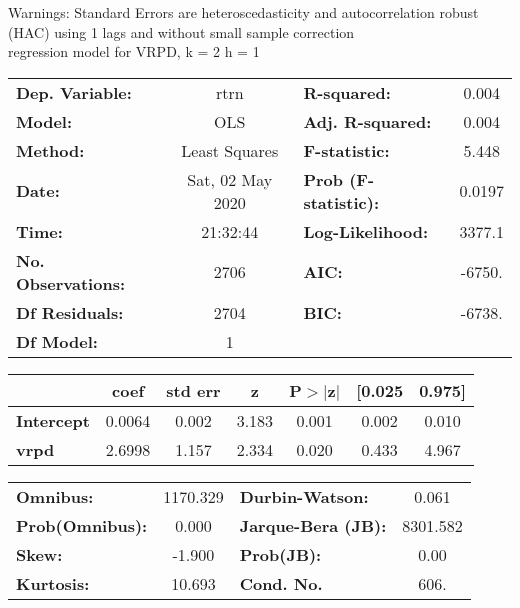 Warnings: \newline
 [1] Standard Errors are heteroscedasticity and autocorrelation robust (HAC) using 1 lags and without small sample correction\\ 

regression model for VRPD, k = 2 h = 1\begin{center}
\begin{tabular}{lclc}
\toprule
\textbf{Dep. Variable:}    &       rtrn       & \textbf{  R-squared:         } &     0.004   \\
\textbf{Model:}            &       OLS        & \textbf{  Adj. R-squared:    } &     0.004   \\
\textbf{Method:}           &  Least Squares   & \textbf{  F-statistic:       } &     5.448   \\
\textbf{Date:}             & Sat, 02 May 2020 & \textbf{  Prob (F-statistic):} &   0.0197    \\
\textbf{Time:}             &     21:32:44     & \textbf{  Log-Likelihood:    } &    3377.1   \\
\textbf{No. Observations:} &        2706      & \textbf{  AIC:               } &    -6750.   \\
\textbf{Df Residuals:}     &        2704      & \textbf{  BIC:               } &    -6738.   \\
\textbf{Df Model:}         &           1      & \textbf{                     } &             \\
\bottomrule
\end{tabular}
\begin{tabular}{lcccccc}
                   & \textbf{coef} & \textbf{std err} & \textbf{z} & \textbf{P$> |$z$|$} & \textbf{[0.025} & \textbf{0.975]}  \\
\midrule
\textbf{Intercept} &       0.0064  &        0.002     &     3.183  &         0.001        &        0.002    &        0.010     \\
\textbf{vrpd}      &       2.6998  &        1.157     &     2.334  &         0.020        &        0.433    &        4.967     \\
\bottomrule
\end{tabular}
\begin{tabular}{lclc}
\textbf{Omnibus:}       & 1170.329 & \textbf{  Durbin-Watson:     } &    0.061  \\
\textbf{Prob(Omnibus):} &   0.000  & \textbf{  Jarque-Bera (JB):  } & 8301.582  \\
\textbf{Skew:}          &  -1.900  & \textbf{  Prob(JB):          } &     0.00  \\
\textbf{Kurtosis:}      &  10.693  & \textbf{  Cond. No.          } &     606.  \\
\bottomrule
\end{tabular}
\end{center}

